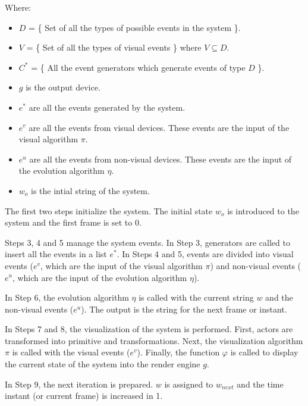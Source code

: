 \documentclass[10pt,journal,letterpaper,compsoc]{IEEEtran}
\begin{document}
Where:

\begin{itemize}
    \item $D$ = \{ Set of all the types of possible events in the system \}.

    \item $V$ = \{ Set of all the types of visual events \} where $V \subseteq D$.

    \item $C^*$ = \{ All the event generators which generate events of type $D$ \}.

    \item $g$ is the output device.

    \item $e^*$ are all the events generated by the system.

    \item $e^v$ are all the events from visual devices. These events are
the input of the visual algorithm $\pi$.

    \item $e^u$ are all the events from non-visual devices. These events
are the input of the evolution algorithm $\eta$.

    \item $w_o$ is the intial string of the system.
\end{itemize}




The first two steps initialize the system. The initial state $w_o$ is
introduced to the system and the first frame is set to 0.

Steps 3, 4 and 5 manage the system events. In Step 3, generators are called to insert all the
events in a list $e^*$. In Steps 4 and 5, events are divided into visual events ($e^v$, which are
the input of the visual algorithm $\pi$) and non-visual events ($e^u$, which are the input of the
evolution algorithm $\eta$).

In Step 6, the evolution algorithm $\eta$ is called with the current string $w$ and the non-visual
events ($e^u$). The output is the string for the next frame or instant.

In Steps 7 and 8, the visualization of the system is performed. First, actors are transformed into
primitive and transformations. Next, the visualization algorithm $\pi$ is called with the visual
events ($e^v$). Finally, the function $\varphi$ is called to display the current state of the
system into the render engine $g$.

In Step 9, the next iteration is prepared. $w$ is assigned to $w_{next}$ and the time instant (or
current frame) is increased in 1.
\end{document}
